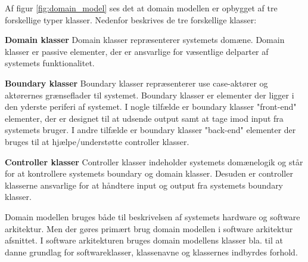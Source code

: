 \newpage

Af figur \ref{fig:domain_model} ses det at domain modellen er opbygget af tre forskellige typer klasser. Nedenfor beskrives de tre forskellige klasser:

\textbf{Domain klasser}\newline
Domain klasser repræsenterer systemets domæne. Domain klasser er passive elementer, der er ansvarlige for væsentlige delparter af systemets funktionalitet.  

\textbf{Boundary klasser}\newline
Boundary klasser repræsenterer use case-aktører og aktørernes grænseflader til systemet. Boundary klasser er elementer der ligger i den yderste periferi af systemet. I nogle tilfælde er boundary klasser "front-end" elementer, der er designet til at udsende output samt at tage imod input fra systemets bruger. I andre tilfælde er boundary klasser "back-end" elementer der bruges til at hjælpe/understøtte controller klasser.

\textbf{Controller klasser} \newline
Controller klasser indeholder systemets domænelogik og står for at kontrollere systemets boundary og domain klasser. Desuden er controller klasserne ansvarlige for at håndtere input og output fra systemets boundary klasser.

\vspace{1cm}

Domain modellen bruges både til beskrivelsen af systemets hardware og software arkitektur. Men der gøres primært brug domain modellen i software arkitektur afsnittet. I software arkitekturen bruges domain modellens klasser bla. til at danne grundlag for softwareklasser, klassenavne og klassernes indbyrdes forhold.







